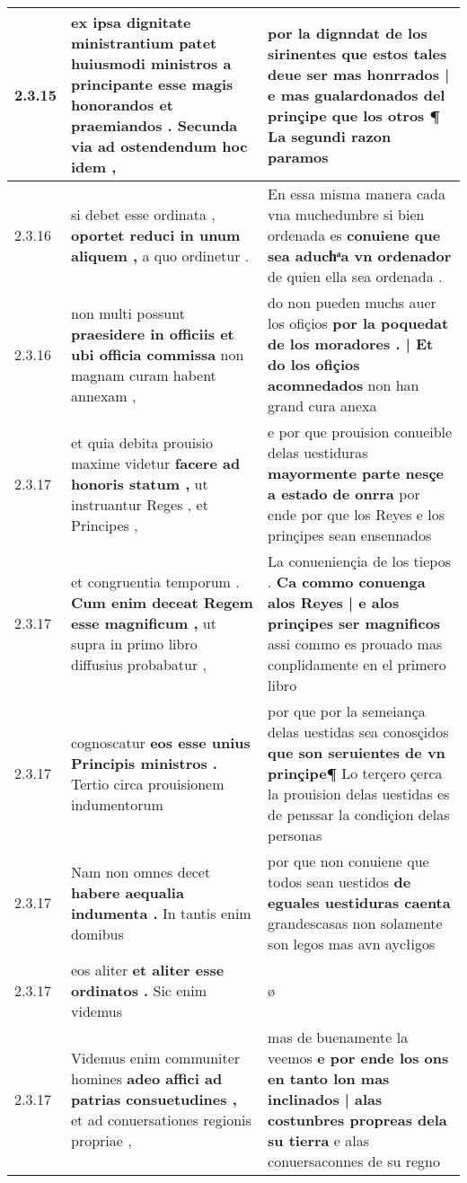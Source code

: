 \begin{tabular}{|p{1cm}|p{6.5cm}|p{6.5cm}|}
2.3.15 & ex ipsa dignitate ministrantium patet \textbf{ huiusmodi ministros a principante esse magis honorandos et praemiandos . } Secunda via ad ostendendum hoc idem , & por la dignndat de los sirinentes \textbf{ que estos tales deue ser mas honrrados | e mas gualardonados del prinçipe que los otros ¶ } La segundi razon paramos \\\hline
2.3.16 & si debet esse ordinata , \textbf{ oportet reduci in unum aliquem , } a quo ordinetur . & En essa misma manera cada vna muchedunbre si bien ordenada es \textbf{ conuiene que sea aduchͣa vn ordenador } de quien ella sea ordenada . \\\hline
2.3.16 & non multi possunt \textbf{ praesidere in officiis et ubi officia commissa } non magnam curam habent annexam , & do non pueden muchs auer los ofiçios \textbf{ por la poquedat de los moradores . | Et do los ofiçios acomnedados } non han grand cura anexa \\\hline
2.3.17 & et quia debita prouisio maxime videtur \textbf{ facere ad honoris statum , } ut instruantur Reges , et Principes , & e por que prouision conueible delas uestiduras \textbf{ mayormente parte nesçe a estado de onrra } por ende por que los Reyes e los prinçipes sean ensennados \\\hline
2.3.17 & et congruentia temporum . \textbf{ Cum enim deceat Regem esse magnificum , } ut supra in primo libro diffusius probabatur , & La conueniençia de los tiepos . \textbf{ Ca commo conuenga alos Reyes | e alos prinçipes ser magnificos } assi commo es prouado mas conplidamente en el primero libro \\\hline
2.3.17 & cognoscatur \textbf{ eos esse unius Principis ministros . } Tertio circa prouisionem indumentorum & por que por la semeiança delas uestidas sea conosçidos \textbf{ que son seruientes de vn prinçipe¶ } Lo terçero çerca la prouision delas uestidas es de penssar la condiçion delas personas \\\hline
2.3.17 & Nam non omnes decet \textbf{ habere aequalia indumenta . } In tantis enim domibus & por que non conuiene que todos sean uestidos \textbf{ de eguales uestiduras caenta } grandescasas non solamente son legos mas avn aycłigos \\\hline
2.3.17 & eos aliter \textbf{ et aliter esse ordinatos . } Sic enim videmus & ø \\\hline
2.3.17 & Videmus enim communiter homines \textbf{ adeo affici ad patrias consuetudines , } et ad conuersationes regionis propriae , & mas de buenamente la veemos \textbf{ e por ende los ons en tanto lon mas inclinados | alas costunbres propreas dela su tierra } e alas conuersaconnes de su regno \\\hline

\end{tabular}
